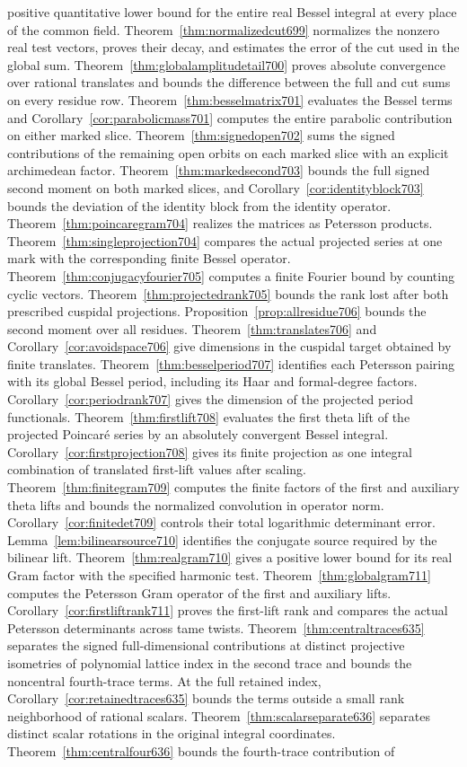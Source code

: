 \documentclass[a4paper,11pt]{article}
\theoremstyle{definition}
\theoremstyle{remark}
\numberwithin{equation}{section}
\begin{document}
positive quantitative lower bound for the entire real Bessel integral at every place of the common field. Theorem~\ref{thm:normalizedcut699} normalizes the nonzero real test vectors, proves their decay, and estimates the error of the cut used in the global sum. Theorem~\ref{thm:globalamplitudetail700} proves absolute convergence over rational translates and bounds the difference between the full and cut sums on every residue row. Theorem~\ref{thm:besselmatrix701} evaluates the Bessel terms and Corollary~\ref{cor:parabolicmass701} computes the entire parabolic contribution on either marked slice. Theorem~\ref{thm:signedopen702} sums the signed contributions of the remaining open orbits on each marked slice with an explicit archimedean factor. Theorem~\ref{thm:markedsecond703} bounds the full signed second moment on both marked slices, and Corollary~\ref{cor:identityblock703} bounds the deviation of the identity block from the identity operator. Theorem~\ref{thm:poincaregram704} realizes the matrices as Petersson products. Theorem~\ref{thm:singleprojection704} compares the actual projected series at one mark with the corresponding finite Bessel operator. Theorem~\ref{thm:conjugacyfourier705} computes a finite Fourier bound by counting cyclic vectors. Theorem~\ref{thm:projectedrank705} bounds the rank lost after both prescribed cuspidal projections. Proposition~\ref{prop:allresidue706} bounds the second moment over all residues. Theorem~\ref{thm:translates706} and Corollary~\ref{cor:avoidspace706} give dimensions in the cuspidal target obtained by finite translates. Theorem~\ref{thm:besselperiod707} identifies each Petersson pairing with its global Bessel period, including its Haar and formal-degree factors. Corollary~\ref{cor:periodrank707} gives the dimension of the projected period functionals. Theorem~\ref{thm:firstlift708} evaluates the first theta lift of the projected Poincar\'e series by an absolutely convergent Bessel integral. Corollary~\ref{cor:firstprojection708} gives its finite projection as one integral combination of translated first-lift values after scaling. Theorem~\ref{thm:finitegram709} computes the finite factors of the first and auxiliary theta lifts and bounds the normalized convolution in operator norm. Corollary~\ref{cor:finitedet709} controls their total logarithmic determinant error. Lemma~\ref{lem:bilinearsource710} identifies the conjugate source required by the bilinear lift. Theorem~\ref{thm:realgram710} gives a positive lower bound for its real Gram factor with the specified harmonic test. Theorem~\ref{thm:globalgram711} computes the Petersson Gram operator of the first and auxiliary lifts. Corollary~\ref{cor:firstliftrank711} proves the first-lift rank and compares the actual Petersson determinants across tame twists. Theorem~\ref{thm:centraltraces635} separates the signed full-dimensional contributions at distinct projective isometries of polynomial lattice index in the second trace and bounds the noncentral fourth-trace terms. At the full retained index, Corollary~\ref{cor:retainedtraces635} bounds the terms outside a small rank neighborhood of rational scalars. Theorem~\ref{thm:scalarseparate636} separates distinct scalar rotations in the original integral coordinates. Theorem~\ref{thm:centralfour636} bounds the fourth-trace contribution of 
\end{document}
